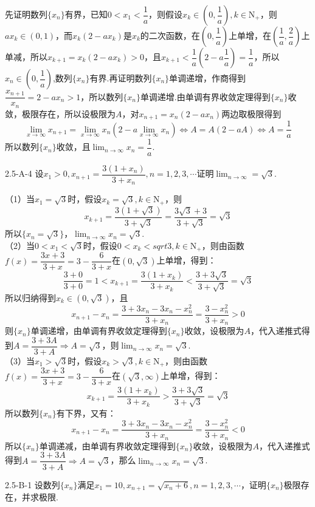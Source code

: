 \begin{solution}
    先证明数列$\{x_n\}$有界，已知$0<x_1<\dfrac1{a}$，则假设$x_k\in(0,\dfrac1{a}),k\in \text{N}_+$，则$ax_k\in(0,1)$，而$x_k(2-ax_k)$是$x_k$的二次函数，在$(0,\dfrac1{a})$上单增，在$(\dfrac1{a},\dfrac2{a})$上单减，所以$x_{k+1}=x_k(2-ax_k)>0$，且$x_{k+1}<\dfrac1{a}(2-a\dfrac1{a})=\dfrac1{a}$，所以$x_n\in(0,\dfrac1a)$,数列$\{x_n\}$有界.再证明数列$\{x_n\}$单调递增，作商得到$\dfrac{x_{n+1}}{x_n}=2-ax_n>1$，所以数列$\{x_n\}$单调递增.由单调有界收敛定理得到$\{x_n\}$收敛，极限存在，所以设极限为$A$，对$x_{n+1}=x_n(2-ax_n)$两边取极限得到\[\displaystyle\lim_{x\to\infty}x_{n+1}=\lim_{x\to\infty}x_n(2-a\lim_{x\to\infty}x_n)\Leftrightarrow A=A(2-aA)\Leftrightarrow A=\dfrac1{a}\]所以数列$\{x_n\}$收敛，且$\lim_{n\to\infty}x_n=\dfrac1{a}$.
\end{solution}
\begin{example}{2.5-A-4}{}
    设$x_1>0,x_{n+1}=\dfrac{3(1+x_n)}{3+x_n},n=1,2,3,\cdots$证明$\displaystyle\lim_{n\to\infty}=\sqrt3$.
\end{example}
\begin{solution}
    （1）当$x_1=\sqrt3$时，假设$x_k=\sqrt3,k\in\text{N}_+$，则
    \[x_{k+1}=\dfrac{3(1+\sqrt3)}{3+\sqrt3}=\dfrac{3\sqrt3+3}{3+\sqrt3}=\sqrt3\]
    所以$\{x_n=\sqrt3\}$，$\lim_{n\to\infty}x_n=\sqrt3$.\\
    （2）当$0<x_1<\sqrt3$时，假设$0<x_k<sqrt3,k\in\text{N}_+$，则由函数$f(x)=\dfrac{3x+3}{3+x}=3-\dfrac{6}{3+x}$在$(0,\sqrt3)$上单增，得到：
    \[\dfrac{3+0}{3+0}=1<x_{k+1}=\dfrac{3(1+x_k)}{3+x_k}<\dfrac{3+3\sqrt3}{3+\sqrt3}=\sqrt3\]所以归纳得到$x_k\in(0,\sqrt3)$，且
    \[x_{n+1}-x_n=\dfrac{3+3x_n-3x_n-x_n^2}{3+x_n}=\dfrac{3-x_n^2}{3+x_n}>0\]
    则$\{x_n\}$单调递增，由单调有界收敛定理得到$\{x_n\}$收敛，设极限为$A$，代入递推式得到$A=\dfrac{3+3A}{3+A}\Rightarrow A=\sqrt3$，则$\lim_{n\to\infty}x_n=\sqrt3$.\\
    （3）当$x_1>\sqrt3$时，假设$x_k>\sqrt3,k\in\text{N}_+$，则由函数$f(x)=\dfrac{3x+3}{3+x}=3-\dfrac{6}{3+x}$在$(\sqrt3,\infty)$上单增，得到：
    \[x_{k+1}=\dfrac{3(1+x_k)}{3+x_k}>\dfrac{3+3\sqrt3}{3+\sqrt3}=\sqrt3\]
    所以数列$\{x_n\}$有下界，又有：\[x_{n+1}-x_n=\dfrac{3+3x_n-3x_n-x_n^2}{3+x_n}=\dfrac{3-x_n^2}{3+x_n}<0\]所以$\{x_n\}$单调递减，由单调有界收敛定理得到$\{x_n\}$收敛，设极限为$A$，代入递推式得到$A=\dfrac{3+3A}{3+A}\Rightarrow A=\sqrt3$，那么$\lim_{n\to\infty}x_n=\sqrt3$.
\end{solution}
\begin{example}{2.5-B-1}{}
    设数列$\{x_n\}$满足$x_1=10,x_{n+1}=\sqrt{x_n+6},n=1,2,3,\cdots$，证明$\{x_n\}$极限存在，并求极限.
\end{example}
